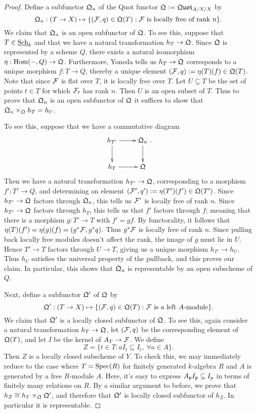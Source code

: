 \begin{proof}
Define a subfunctor $\mathfrak{Q}_n$ of the Quot functor $\mathfrak{Q} := \mathfrak{Quot}_{A/X/X}$ by
$$\mathfrak{Q}_n: (T\rightarrow X)\mapsto \{(\mathcal{F},q)\in \mathfrak{Q}(T): \mathcal{F}\ \text{is locally free of rank $n$}\}.$$
We claim that $\mathfrak{Q}_n$ is an open subfunctor of $\mathfrak{Q}$.  To see this, suppose that $T\in\textnormal{\underline{Sch}}_k$ and that we have a natural transformation $h_T\rightarrow \mathfrak{Q}$.  Since $\mathfrak{Q}$ is represented by a scheme $Q$, there exists a natural isomorphism $\eta: \textnormal{Hom}(-,Q)\rightarrow\mathfrak{Q}$.  Furthermore, Yoneda tells us $h_T\rightarrow \mathfrak{Q}$ corresponds to a unique morphism $f:T\rightarrow Q$, thereby a unique element $(\mathcal{F},q) := \eta(T)(f)\in \mathfrak{Q}(T)$.  Note that since $\mathcal{F}$ is flat over $T$, it is locally free over $T$.  Let $U\subseteq T$ be the set of points $t\in T$ for which $\mathcal{F}_t$ has rank $n$.  Then $U$ is an open subset of $T$.  Thus to prove that $\mathfrak{Q}_n$ is an open subfunctor of $\mathfrak{Q}$ it suffices to show that $\mathfrak{Q}_n\times_{\mathfrak{Q}}h_T = h_U$.

To see this, suppose that we have a commutative diagram
$$\xymatrix{
h_{T'}\ar[d]\ar[r] & \FQ_n\ar[d]\\
h_{T}\ar[r]        & \FQ
}.$$
Then we have a natural transformation $h_{T'}\rightarrow\mathfrak{Q}$, corresponding to a morphism $f': T'\rightarrow Q$, and determining an element $(\mathcal{F}',q') := \eta(T')(f')\in \mathfrak{Q}(T')$.  Since $h_{T'}\rightarrow\mathfrak{Q}$ factors through $\mathfrak{Q}_n$, this tells us $\mathcal{F}'$ is locally free of rank $n$.  Since $h_{T'}\rightarrow\mathfrak{Q}$ factors through $h_T$, this tells us that $f'$ factors through $f$; meaning that there is a morphism $g:T'\rightarrow T$ with $f'=gf$.  By functorality, it follows that $\eta(T)(f') = \eta(g)(f) = (g^*\mathcal{F},g^*q)$.  Thus $g^*\mathcal{F}$ is locally free of rank $n$.  Since pulling back locally free modules doesn't affect the rank, the image of $g$ must lie in $U$.  Hence $T'\rightarrow T$ factors through $U\rightarrow T$, giving us a unique morphism $h_{T'}\rightarrow h_U$.  Thus $h_U$ satisfies the universal property of the pullback, and this proves our claim.  In particular, this shows that $\mathfrak{Q}_n$ is representable by an open subscheme of $Q$.

Next, define a subfunctor $\mathfrak{Q}'$ of $\mathfrak{Q}$ by
$$\mathfrak{Q}': (T\rightarrow X)\mapsto \{(\mathcal{F},q)\in \mathfrak{Q}(T): \mathcal{F}\ \text{is a left $A$-module}\}.$$
We claim that $\mathfrak{Q}'$ is a locally closed subfunctor of $\mathfrak{Q}$.  To see this, again consider a natural transformation $h_T\rightarrow\mathfrak{Q}$, let $(\mathcal{F},q)$ be the corresponding element of $\mathfrak{Q}(T)$, and let $I$ be the kernel of $A_T\rightarrow \mathcal{F}$.  We define
$$Z = \{t\in T: aI_t\subseteq I_t,\ \forall a\in A\}.$$
Then $Z$ is a locally closed subscheme of $Y$.  To check this, we may immediately reduce to the case where $T=\textnormal{Spec}(R)$ for finitely generated $k$-algebra $R$ and $A$ is generated by a free $R$-module $A$.  Here, it's easy to express $A_{\mathfrak{p}} I_{\mathfrak{p}}\subseteq I_p$ in terms of finitely many relations on $R$.  By a similar argument to before, we prove that $h_Z\cong h_T\times_{\mathfrak{Q}} \mathfrak{Q}'$, and therefore that $\mathfrak{Q}'$ is locally closed subfunctor of $h_Z$.  In particular it is representable.


\end{proof}
